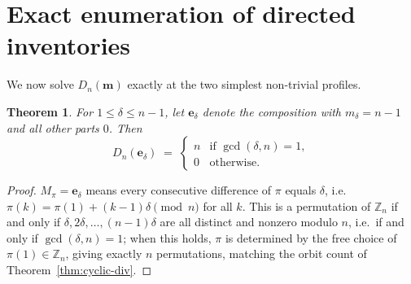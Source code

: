 \documentclass[11pt,a4paper]{amsart}
\newtheorem{theorem}{Theorem}[section]
\newcommand{\Z}{\mathbb{Z}}
\newcommand{\1}{\mathbf{1}}
\begin{document}
\section{\textbf{ Exact enumeration of directed inventories}}
We now solve $D_n(\mathbf m)$ exactly at the two simplest non-trivial profiles.
\begin{theorem}\label{thm:single-delta}
For $1\le\delta\le n-1$, let $\mathbf e_\delta$ denote the composition with $m_\delta=n-1$ and all other parts $0$. Then
\[
D_n(\mathbf e_\delta) \;=\; \begin{cases} n & \text{if } \gcd(\delta,n)=1,\\ 0 & \text{otherwise.}\end{cases}
\]
\end{theorem}
\begin{proof}
$M_\pi=\mathbf e_\delta$ means every consecutive difference of $\pi$ equals $\delta$, i.e.\ $\pi(k)=\pi(1)+(k{-}1)\delta\pmod n$ for all $k$. This is a permutation of $\Z_n$ if and only if $\delta,2\delta,\dots,(n{-}1)\delta$ are all distinct and nonzero modulo $n$, i.e.\ if and only if $\gcd(\delta,n)=1$; when this holds, $\pi$ is determined by the free choice of $\pi(1)\in\Z_n$, giving exactly $n$ permutations, matching the orbit count of Theorem~\ref{thm:cyclic-div}.
\end{proof}
\end{document}
